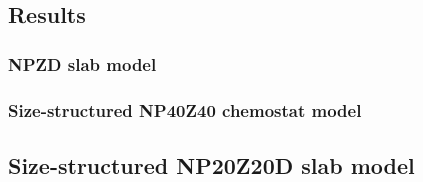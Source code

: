 \documentclass[journal abbreviation, manuscript]{copernicus}
\begin{document}
\subsection{Results}

\subsubsection{NPZD slab model}
\subsubsection{Size-structured NP40Z40 chemostat model}

\subsection{Size-structured NP20Z20D slab model}
\end{document}
